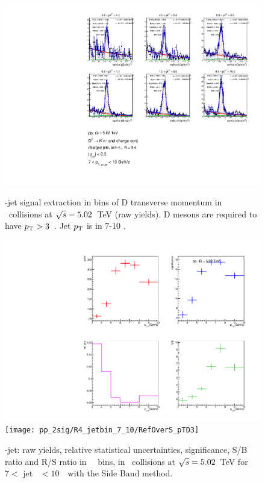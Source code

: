 \begin{figure}[bth]
\centering
\begin{minipage}{.65\textwidth}
  \centering
  \includegraphics[width=\linewidth]{pp_2sig/R4_jetbin_7_10/invMass_pTD3}
\caption{\Dzero-jet signal extraction in bins of D transverse momentum in \pp\ collisions at $\sqrt{s}=5.02$~TeV (raw yields). D mesons are required to have $p_{\rm T}>3$~\GeVc. Jet $p_{\rm T}$ is in 7-10 \GeVc.
}
\label{fig:eq_pp_InvMass_Dzero_7_10_R4}
\end{minipage}%
\begin{minipage}{.4\textwidth}
  \centering
  \includegraphics[width=\linewidth]{pp_2sig/R4_jetbin_7_10/signalParams_pTD3}
  \texttt{[image: pp\_2sig/R4\_jetbin\_7\_10/RefOverS\_pTD3]}
\caption{%
\Dzero-jet: raw yields, relative statistical uncertainties, significance, S/B ratio and R/S ratio in \Dzero\ \pt\ bins, in \pp\ collisions at $\sqrt{s}=5.02$~TeV for $7<$ jet \pt\ $<10$~\GeVc\ with the Side Band method.
}
\label{fig:eq_pp_signalParams_7_10_R4}
\end{minipage}
\end{figure}
